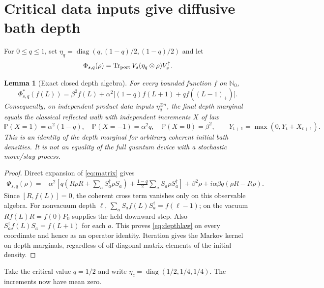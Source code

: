 \documentclass[11pt]{article}
\newtheorem{lemma}[theorem]{Lemma}
\newcommand{\Tr}{\operatorname{Tr}}
\newcommand{\Prob}{\mathbb P}
\begin{document}
\section{Critical data inputs give diffusive bath depth}\label{sec:depth}

For $0\le q\le1$, set $\eta_q=\operatorname{diag}(q,(1-q)/2,(1-q)/2)$ and let
\[
 \Phi_{s,q}(\rho)=\Tr_{\rm port}V_s(\eta_q\otimes\rho)V_s^\dagger.
\]

\begin{lemma}[Exact closed depth algebra]\label{lem:depth}
For every bounded function $f$ on $\mathbb N_0$,
\begin{equation}
 \Phi_{s,q}^*(f(L))=\beta^2 f(L)+\alpha^2\big[(1-q)f(L+1)+q f((L-1)_+)\big].
 \label{eq:depthlaw}
\end{equation}
Consequently, on independent product data inputs $\eta_q^{\otimes n}$, the final depth marginal equals the classical reflected walk with independent increments $X$ of law
\[
 \Prob(X=1)=\alpha^2(1-q),\quad
 \Prob(X=-1)=\alpha^2q,\quad
 \Prob(X=0)=\beta^2,
 \qquad Y_{t+1}=\max(0,Y_t+X_{t+1}).
\]
This is an identity of the depth marginal for arbitrary coherent initial bath densities. It is not an equality of the full quantum device with a stochastic move/stay process.
\end{lemma}
\begin{proof}
Direct expansion of \eqref{eq:matrix} gives
\begin{align*}
 \Phi_{s,q}(\rho)={}&\alpha^2\left[q\left(R\rho R+\sum_a S_a^\dagger\rho S_a\right)
 +\frac{1-q}{2}\sum_a S_a\rho S_a^\dagger\right]+\beta^2\rho
 +i\alpha\beta q(\rho R-R\rho).
\end{align*}
Since $[R,f(L)]=0$, the coherent cross term vanishes only on this observable algebra. For nonvacuum depth $\ell$, $\sum_a S_a f(L)S_a^\dagger=f(\ell-1)$; on the vacuum $Rf(L)R=f(0)P_0$ supplies the held downward step. Also $S_a^\dagger f(L)S_a=f(L+1)$ for each $a$. This proves \eqref{eq:depthlaw} on every coordinate and hence as an operator identity. Iteration gives the Markov kernel on depth marginals, regardless of off-diagonal matrix elements of the initial density.
\end{proof}

Take the critical value $q=1/2$ and write $\eta_c=\operatorname{diag}(1/2,1/4,1/4)$. The increments now have mean zero.
\end{document}
